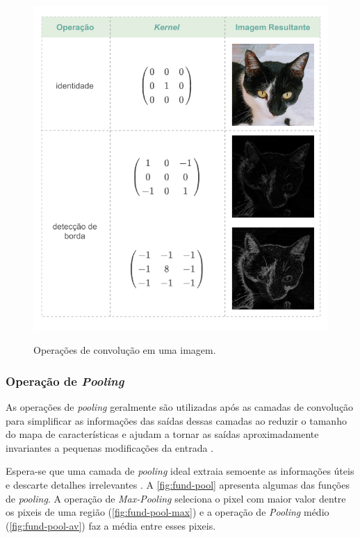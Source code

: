 \begin{figure}[h!] %
  \centering
  \caption{Operações de convolução em uma imagem.}
  \includegraphics[scale=1.1]{img/img-fundamentacao-fifits.pdf}
  \label{fig:fund-fifits}
\end{figure}

\subsubsection{Operação de \textit{Pooling}} \label{cap:fund-ia-rn-conv-pool}
As operações de \textit{pooling} geralmente são utilizadas após as camadas de convolução para simplificar as informações das saídas dessas camadas \cite{ref:Nielsen} ao reduzir o tamanho do mapa de características \cite{ref:Gholamalinezhad-Khosravi} e ajudam a tornar as saídas aproximadamente invariantes a pequenas modificações da entrada \cite{ref:Goodfellow-Bengio-Courville}.

Espera-se que uma camada de \textit{pooling} ideal extraia semoente as informações úteis e descarte detalhes irrelevantes \cite{ref:Gholamalinezhad-Khosravi}. A \autoref{fig:fund-pool} apresenta algumas das funções de \textit{pooling}. A operação de \textit{Max-Pooling} seleciona o pixel com maior valor dentre os pixeis de uma região (\autoref{fig:fund-pool-max}) e a operação de \textit{Pooling} médio (\autoref{fig:fund-pool-av}) faz a média entre esses pixeis.

